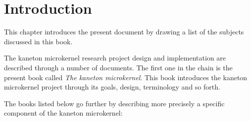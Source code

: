 %
%
%
%
%
%

%
%

\chapter{Introduction}

This chapter introduces the present document by drawing a list of the subjects
discussed in this book.

\newpage

%
%

The kaneton microkernel research project design and implementation are
described through a number of documents. The first one in the chain is
the present book called \textit{The kaneton microkernel}. This book introduces
the kaneton microkernel project through its goals, design, terminology and so
forth.

The books listed below go further by describing more precisely a specific
component of the kaneton microkernel:

